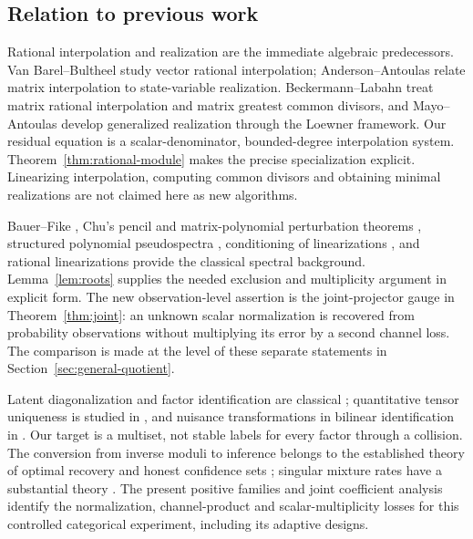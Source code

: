 \documentclass[11pt,reqno]{amsart}
\numberwithin{equation}{section}
\theoremstyle{definition}\newtheorem{definition}[theorem]{Definition}
\theoremstyle{remark}\newtheorem{remark}[theorem]{Remark}
\begin{document}
\subsection{Relation to previous work}
Rational interpolation and realization are the immediate algebraic
predecessors. Van Barel--Bultheel \cite{VBB} study vector rational
interpolation; Anderson--Antoulas \cite{AA90} relate matrix interpolation
to state-variable realization. Beckermann--Labahn \cite{BL00} treat
matrix rational interpolation and matrix greatest common divisors, and
Mayo--Antoulas \cite{MA07} develop generalized realization through the
Loewner framework. Our residual equation is a scalar-denominator,
bounded-degree interpolation system. Theorem~\ref{thm:rational-module}
makes the precise specialization explicit. Linearizing interpolation,
computing common divisors and obtaining minimal realizations are not
claimed here as new algorithms.

Bauer--Fike \cite{BF}, Chu's pencil and matrix-polynomial perturbation
theorems \cite{Chu87,Chu03}, structured polynomial pseudospectra
\cite{TH}, conditioning of linearizations \cite{HMT}, and rational
linearizations \cite{SB} provide the classical spectral background.
Lemma~\ref{lem:roots} supplies the needed exclusion and multiplicity
argument in explicit form. The new observation-level assertion is the
joint-projector gauge in Theorem~\ref{thm:joint}: an unknown scalar
normalization is recovered from probability observations without
multiplying its error by a second channel loss. The comparison is made
at the level of these separate statements in
Section~\ref{sec:general-quotient}.

Latent diagonalization and factor identification are classical
\cite{AMR,BJR}; quantitative tensor uniqueness is studied in
\cite{BCV}, and nuisance transformations in bilinear identification
in \cite{LLB}. Our target is a multiset, not stable labels for every
factor through a collision. The conversion from inverse moduli to
inference belongs to the established theory of optimal recovery and
honest confidence sets \cite{Donoho,CaiLow,Dufour}; singular mixture
rates have a substantial theory \cite{HN}. The present positive
families and joint coefficient analysis identify the normalization,
channel-product and scalar-multiplicity losses for this controlled
categorical experiment, including its adaptive designs.





\end{document}
